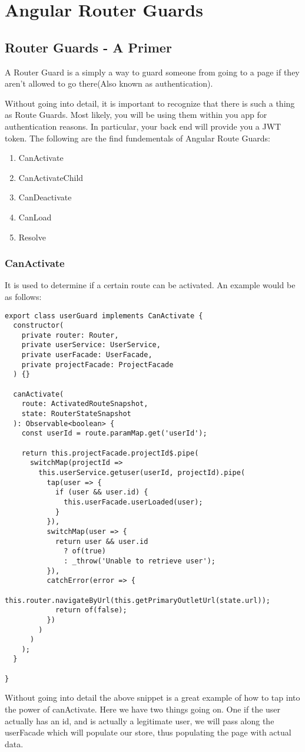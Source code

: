 
\chapter{ Angular Router Guards }

\section{ Router Guards - A Primer }
A Router Guard is a simply a way to guard someone from going to a page if they
aren't allowed to go there(Also known as authentication).

Without going into detail, it is important to recognize that there is such a
thing as Route Guards. Most likely, you will be using them within you app
for authentication reasons. In particular, your back end will provide you a JWT
token. The following are the find fundementals of Angular Route Guards:
\begin{enumerate}
  \item CanActivate
  \item CanActivateChild
  \item CanDeactivate
  \item CanLoad
  \item Resolve
\end{enumerate}

\subsection{ CanActivate }
It is used to determine if a certain route can be activated. An example would
be as follows:
\begin{lstlisting}
export class userGuard implements CanActivate {
  constructor(
    private router: Router,
    private userService: UserService,
    private userFacade: UserFacade,
    private projectFacade: ProjectFacade
  ) {}

  canActivate(
    route: ActivatedRouteSnapshot,
    state: RouterStateSnapshot
  ): Observable<boolean> {
    const userId = route.paramMap.get('userId');

    return this.projectFacade.projectId$.pipe(
      switchMap(projectId =>
        this.userService.getuser(userId, projectId).pipe(
          tap(user => {
            if (user && user.id) {
              this.userFacade.userLoaded(user);
            }
          }),
          switchMap(user => {
            return user && user.id
              ? of(true)
              : _throw('Unable to retrieve user');
          }),
          catchError(error => {
            this.router.navigateByUrl(this.getPrimaryOutletUrl(state.url));
            return of(false);
          })
        )
      )
    );
  }

}
\end{lstlisting}
Without going into detail the above snippet is a great example of how to tap
into the power of canActivate. Here we have two things going on. One if the user
actually has an id, and is actually a legitimate user, we will pass along the
userFacade which will populate our store, thus populating the page with actual
data.

